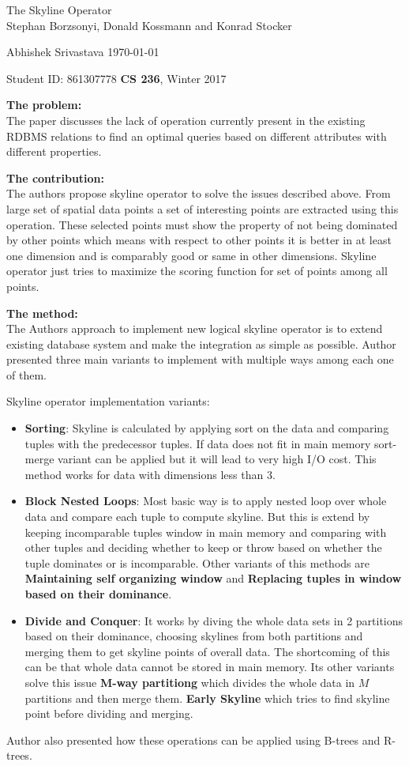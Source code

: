 \documentclass[a4paper,12pt, twoside]{article}
\renewcommand{\maketitle}{%
 	\Large
 	\begin{center}
 	The Skyline Operator \\	
 	\normalsize Stephan Borzsonyi, Donald Kossmann and Konrad Stocker
 	\end{center}
 
 	\Large
	Abhishek Srivastava
	\hfill
	\normalsize
	\today
 	\par
 	Student ID: 861307778
 	\hfill
 	\textbf{CS 236}, Winter 2017
 	\par 	
 	\hrulefill
 	\par
 	}
\begin{document}
\thispagestyle{empty}
	
\maketitle

\textbf{The problem:}\\
The paper discusses the lack of operation currently present in the existing RDBMS relations to find an optimal queries based on different attributes with different properties.  

\textbf{The contribution:}\\
The authors propose skyline operator to solve the issues described above. From large set of spatial data points a set of interesting points are extracted using this operation. These selected points must show the property of not being dominated by other points which means with respect to other points it is better in at least one dimension and is comparably good or same in other dimensions. Skyline operator just tries to maximize the scoring function for set of points among all points. 

\textbf{The method:}\\
The Authors approach to implement new logical skyline operator is to extend existing database system and make the integration as simple as possible. Author presented three main variants to implement with multiple ways among each one of them.

Skyline operator implementation variants: 
\begin{itemize}
	\item \textbf{Sorting}: Skyline is calculated by applying sort on the data and comparing tuples with the predecessor tuples. If data does not fit in main memory sort-merge variant can be applied but it will lead to very high I/O cost. This method works for data with dimensions less than 3.
	\item \textbf{Block Nested Loops}: Most basic way is to apply nested loop over whole data and compare each tuple to compute skyline. But this is extend by keeping incomparable tuples window in main memory and comparing with other tuples and deciding whether to keep or throw based on whether the tuple dominates or is incomparable. Other variants of this methods are \textbf{Maintaining self organizing window} and \textbf{Replacing tuples in window based on their dominance}.
	\item \textbf{Divide and Conquer}: It works by diving the whole data sets in 2 partitions based on their dominance, choosing skylines from both partitions and merging them to get skyline points of overall data. The shortcoming of this can be that whole data cannot be stored in main memory. Its other variants solve this issue \textbf{M-way partitiong} which divides the whole data in $M$ partitions and then merge them. \textbf{Early Skyline} which tries to find skyline point before dividing and merging.
\end{itemize}
Author also presented how these operations can be applied using B-trees and R-trees.
\end{document}
